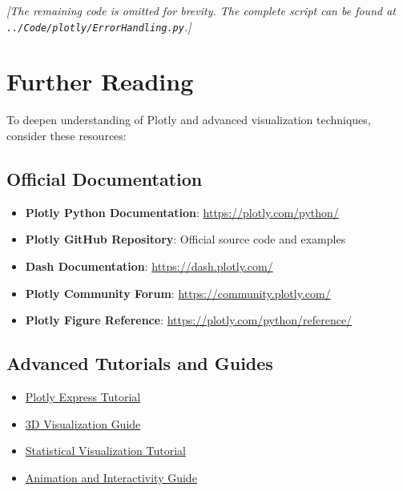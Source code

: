

\noindent\textit{[The remaining code is omitted for brevity. The complete script can be found at \texttt{../Code/plotly/ErrorHandling.py}.]}

\section{Further Reading}
\label{sec:further_reading}

To deepen understanding of Plotly and advanced visualization techniques, consider these resources:

\subsection{Official Documentation}
\begin{itemize}
	\item \textbf{Plotly Python Documentation}: \url{https://plotly.com/python/}
	\item \textbf{Plotly GitHub Repository}: Official source code and examples \cite{Plotly:2024}
	\item \textbf{Dash Documentation}: \url{https://dash.plotly.com/}
	\item \textbf{Plotly Community Forum}: \url{https://community.plotly.com/}
	\item \textbf{Plotly Figure Reference}: \url{https://plotly.com/python/reference/}
\end{itemize}

\subsection{Advanced Tutorials and Guides}
\begin{itemize}
	\item \href{https://plotly.com/python/plotly-express/}{Plotly Express Tutorial}
	\item \href{https://plotly.com/python/3d-charts/}{3D Visualization Guide}
	\item \href{https://plotly.com/python/statistical-charts/}{Statistical Visualization Tutorial} \cite{Sievert:2020}
	\item \href{https://plotly.com/python/animations/}{Animation and Interactivity Guide}
\end{itemize}

